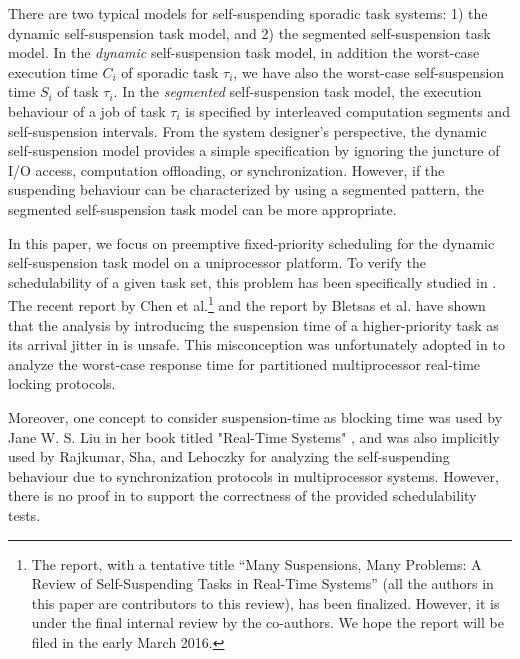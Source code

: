 There are two typical models for self-suspending sporadic task
systems: 1) the dynamic self-suspension task model, and 2) the
segmented self-suspension task model. In the \emph{dynamic}
self-suspension task model, in addition the worst-case execution time
$C_i$ of sporadic task $\tau_i$, we have also the worst-case
self-suspension time $S_i$ of task $\tau_i$. In the \emph{segmented} self-suspension
task model, the execution behaviour of a job of task $\tau_i$ is
specified by interleaved computation segments and self-suspension
intervals.  From the system designer's perspective, the dynamic
self-suspension model provides a simple specification by ignoring the
juncture of I/O access, computation offloading, or
synchronization. However, if the suspending behaviour can be
characterized by using a segmented pattern, the segmented
self-suspension task model can be more appropriate.

In this paper, we focus on preemptive fixed-priority scheduling for
the dynamic self-suspension task model on a uniprocessor platform. To
verify the schedulability of a given task set, this problem has been
specifically studied in
\cite{RTCSA-KimCPKH95,MingLiRTCSA1994,ECRTS-AudsleyB04,RTAS-AudsleyB04,huangpass:dac2015}.
The recent report by Chen et al.\footnote{The report, with a tentative
  title ``Many Suspensions, Many Problems: A Review of
  Self-Suspending Tasks in Real-Time Systems'' (all the authors in
  this paper are contributors to this review), has been
  finalized. However, it is under the final internal review by the
  co-authors.  We hope the report will be filed in the early March
  2016.} and the report by Bletsas et al. \cite{BletsasReport2015}
have shown that the analysis by introducing the suspension time of a
higher-priority task as its arrival jitter in
\cite{ECRTS-AudsleyB04,RTAS-AudsleyB04,RTCSA-KimCPKH95,MingLiRTCSA1994}
is unsafe.  This misconception was unfortunately adopted in
\cite{zeng-2011,bbb-2013,yang-2013,kim-2014,han-2014,carminati-2014,yang-2014,lakshmanan-2009}
to analyze the worst-case response time for partitioned multiprocessor
real-time locking protocols.

Moreover, one concept to consider suspension-time as blocking time was
used by Jane W. S. Liu in her book titled "Real-Time Systems"
\cite[Pages 164-165]{Liu:2000:RS:518501}, and was also implicitly used
by Rajkumar, Sha, and Lehoczky \cite[Page
267]{DBLP:conf/rtss/RajkumarSL88} for analyzing the self-suspending
behaviour due to synchronization protocols in multiprocessor systems.
However, there is no proof in
\cite{Liu:2000:RS:518501,DBLP:conf/rtss/RajkumarSL88} to support the
correctness of the provided schedulability tests.

